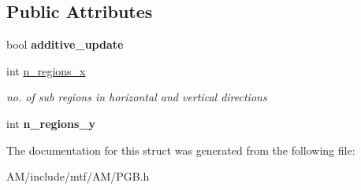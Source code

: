 \subsection*{Public Attributes}
\begin{DoxyCompactItemize}
\item 
\hypertarget{structPGBParams_ae7f57bc491f3154f52f7f258c1c609a1}{bool {\bfseries additive\-\_\-update}}\label{structPGBParams_ae7f57bc491f3154f52f7f258c1c609a1}

\item 
\hypertarget{structPGBParams_a2a59877a038f654df446e81aa203ec43}{int \hyperlink{structPGBParams_a2a59877a038f654df446e81aa203ec43}{n\-\_\-regions\-\_\-x}}\label{structPGBParams_a2a59877a038f654df446e81aa203ec43}

\begin{DoxyCompactList}\small\item\em no. of sub regions in horizontal and vertical directions \end{DoxyCompactList}\item 
\hypertarget{structPGBParams_a09396a19485480413cb0cbfd03b04af0}{int {\bfseries n\-\_\-regions\-\_\-y}}\label{structPGBParams_a09396a19485480413cb0cbfd03b04af0}

\end{DoxyCompactItemize}


The documentation for this struct was generated from the following file\-:\begin{DoxyCompactItemize}
\item 
A\-M/include/mtf/\-A\-M/P\-G\-B.\-h\end{DoxyCompactItemize}
